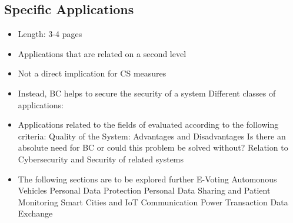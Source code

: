 \subsection{Specific Applications}


\begin{itemize}
\item Length: 3-4 pages
\item Applications that are related on a second level
\item Not a direct implication for CS measures
\item Instead, BC helps to secure the security of a system
Different classes of applications:
\item Applications related to the fields of evaluated according to the following criteria:
\subitem Quality of the System: Advantages and Disadvantages
\subitem Is there an absolute need for BC or could this problem be solved without?
\subitem Relation to Cybersecurity and Security of related systems
\item The following sections are to be explored further
\subitem E-Voting \cite{Osgood2016} \cite{BenAyed2017a}
\subitem Automonous Vehicles \cite{Dorri2017b} \cite{Rowan2017a}
\subitem Personal Data Protection \cite{Zyskind2015a}
\subitem Personal Data Sharing and Patient Monitoring \cite{Yue2016a}
\subitem Smart Cities and IoT \cite{Biswas2016a}
\subitem Communication \cite{Rowan2017a}
\subitem Power Transaction
\subitem Data Exchange

\end{itemize}

